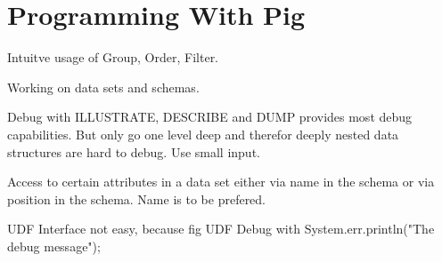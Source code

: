 \section{Programming With Pig}

Intuitve usage of Group, Order, Filter.

Working on data sets and schemas.

Debug with ILLUSTRATE, DESCRIBE and DUMP provides most debug capabilities. But only go one level deep and therefor deeply nested data structures are hard to debug. Use small input. 



Access to certain attributes in a data set either via name in the schema or via position in the schema. Name is to be prefered.




UDF Interface not easy, because fig 
UDF Debug with System.err.println("The debug message");